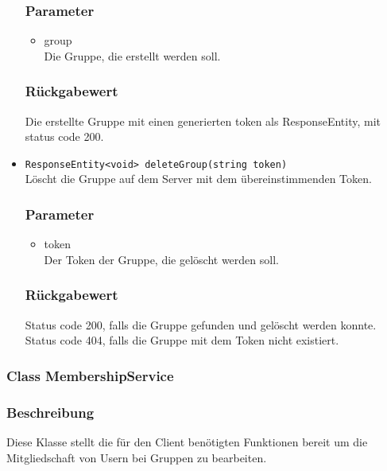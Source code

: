 \documentclass[a4paper]{scrreprt}
\begin{document}
\begin{addmargin}[25pt]{0pt}
\begin{itemize}
	\subsubsection*{Parameter}
	\begin{itemize}
	\item group \\
		Die Gruppe, die erstellt werden soll.
	\end{itemize}

	\subsubsection*{Rückgabewert}
	Die erstellte Gruppe mit einen generierten token als ResponseEntity, mit status code 200.
	
\item \texttt{ResponseEntity<void> deleteGroup(string token)}\\
	Löscht die Gruppe auf dem Server mit dem übereinstimmenden Token.

	\subsubsection*{Parameter}
	\begin{itemize}
	\item token \\
		Der Token der Gruppe, die gelöscht werden soll.
	\end{itemize}

	\subsubsection*{Rückgabewert}
	Status code 200, falls die Gruppe gefunden und gelöscht werden konnte.
	Status code 404, falls die Gruppe mit dem Token nicht existiert.


\end{itemize}
\end{addmargin}


\subsubsection{Class MembershipService}
\subsubsection*{Beschreibung}
Diese Klasse stellt die für den Client benötigten Funktionen bereit um die Mitgliedschaft von Usern bei Gruppen zu bearbeiten. 
\end{document}
